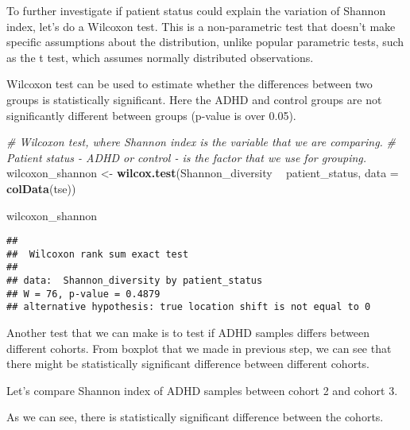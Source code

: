 \documentclass[
  oneside]{book}
\newenvironment{Shaded}{\begin{snugshade}}{\end{snugshade}}
\newcommand{\CommentTok}[1]{\textcolor[rgb]{0.56,0.35,0.01}{\textit{#1}}}
\newcommand{\DataTypeTok}[1]{\textcolor[rgb]{0.13,0.29,0.53}{#1}}
\newcommand{\KeywordTok}[1]{\textcolor[rgb]{0.13,0.29,0.53}{\textbf{#1}}}
\newcommand{\NormalTok}[1]{#1}
\newcommand{\OperatorTok}[1]{\textcolor[rgb]{0.81,0.36,0.00}{\textbf{#1}}}
\newcommand{\StringTok}[1]{\textcolor[rgb]{0.31,0.60,0.02}{#1}}
\begin{document}
To further investigate if patient status could explain the variation
of Shannon index, let's do a Wilcoxon test. This is a non-parametric
test that doesn't make specific assumptions about the distribution,
unlike popular parametric tests, such as the t test, which assumes
normally distributed observations.

Wilcoxon test can be used to estimate whether the differences between
two groups is statistically significant. Here the ADHD and control
groups are not significantly different between groups (p-value is over
0.05).

\begin{Shaded}
\begin{Highlighting}[]
\CommentTok{# Wilcoxon test, where Shannon index is the variable that we are comparing. }
\CommentTok{# Patient status - ADHD or control - is the factor that we use for grouping. }
\NormalTok{wilcoxon_shannon <-}\StringTok{ }\KeywordTok{wilcox.test}\NormalTok{(Shannon_diversity }\OperatorTok{~}\StringTok{ }\NormalTok{patient_status, }\DataTypeTok{data =} \KeywordTok{colData}\NormalTok{(tse))}

\NormalTok{wilcoxon_shannon}
\end{Highlighting}
\end{Shaded}

\begin{verbatim}
## 
##  Wilcoxon rank sum exact test
## 
## data:  Shannon_diversity by patient_status
## W = 76, p-value = 0.4879
## alternative hypothesis: true location shift is not equal to 0
\end{verbatim}

Another test that we can make is to test if ADHD samples differs between different
cohorts. From boxplot that we made in previous step, we can see that there might
be statistically significant difference between different cohorts.

Let's compare Shannon index of ADHD samples between cohort 2 and cohort 3.

As we can see, there is statistically significant difference between the cohorts.
\end{document}
